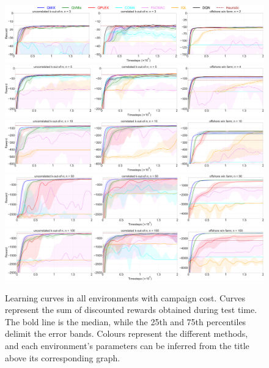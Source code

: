 \begin{figure}
\includegraphics[width=\textwidth]{figures/ch5/all_3_cc_True.pdf}
\includegraphics[width=\textwidth]{figures/ch5/all_5_cc_True.pdf}
\includegraphics[width=\textwidth]{figures/ch5/all_10_cc_True.pdf}
\includegraphics[width=\textwidth]{figures/ch5/all_50_cc_True.pdf}
\includegraphics[width=\textwidth]{figures/ch5/all_100_cc_True.pdf}
\caption{
Learning curves in all environments with campaign cost. 
Curves represent the sum of discounted rewards obtained during test time.
The bold line is the median, while the 25th and 75th percentiles delimit the error bands.
Colours represent the different methods, and each environment's parameters can be inferred from the title above its corresponding graph.
}
\label{fig:learning_curves_cc_true}
\end{figure}

